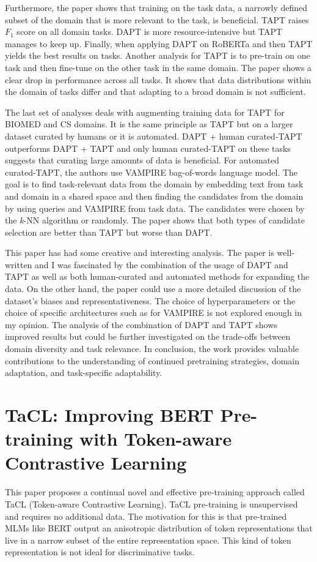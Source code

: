 \documentclass[times, utf8, seminar]{fer}
\begin{document}
Furthermore, the paper shows that training on the task data, a narrowly defined subset of the domain that is more relevant to the task, is beneficial. TAPT raises \emph{$F_1$} score on all domain tasks. DAPT is more resource-intensive but TAPT manages to keep up. Finally, when applying DAPT on RoBERTa and then TAPT yields the best results on tasks. Another analysis for TAPT is to pre-train on one task and then fine-tune on the other task in the same domain. The paper shows a clear drop in performance across all tasks. It shows that data distributions within the domain of tasks differ and that adapting to a broad domain is not sufficient.


The last set of analyses deals with augmenting training data for TAPT for BIOMED and CS domains. It is the same principle as TAPT but on a larger dataset curated by humans or it is automated. DAPT + human curated-TAPT outperforms DAPT + TAPT and only human curated-TAPT on these tasks suggests that curating large amounts of data is beneficial. For automated curated-TAPT, the authors use VAMPIRE \citep{gururangan2019variational} bag-of-words language model. The goal is to find task-relevant data from the domain by embedding text from task and domain in a shared space and then finding the candidates from the domain by using queries and VAMPIRE from task data. The candidates were chosen by the \emph{k}-NN algorithm or randomly. The paper shows that both types of candidate selection are better than TAPT but worse than DAPT.


This paper has had some creative and interesting analysis. The paper is well-written and I was fascinated by the combination of the usage of DAPT and TAPT as well as both human-curated and automated methods for expanding the data. On the other hand, the paper could use a more detailed discussion of the dataset's biases and representativeness. The choice of hyperparameters or the choice of specific architectures such as for VAMPIRE is not explored enough in my opinion. The analysis of the combination of DAPT and TAPT shows improved results but could be further investigated on the trade-offs between domain diversity and task relevance. In conclusion, the work provides valuable contributions to the understanding of continued pretraining strategies, domain adaptation, and task-specific adaptability.

\chapter{TaCL: Improving BERT Pre-training with Token-aware Contrastive Learning \citep{su2021tacl}}
This paper proposes a continual novel and effective pre-training approach called TaCL (Token-aware Contrastive Learning). TaCL pre-training is unsupervised and requires no additional data. The motivation for this is that pre-trained MLMs like BERT \citep{devlin2018bert} output an anisotropic distribution of token representations that live in a narrow subset of the entire representation space. This kind of token representation is not ideal for discriminative tasks.
\end{document}
